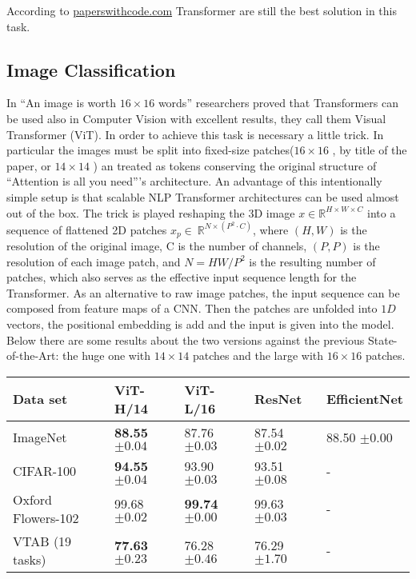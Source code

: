 \documentclass[11pt]{article}
\newcommand\R{\ensuremath{\mathbb{R}}}
\begin{document}
\noindent According to \href{https://paperswithcode.com/sota/machine-translation-on-wmt2014-english-german}{paperswithcode.com} Transformer are still the best solution in this task.

\subsection{Image Classification}
In ``An image is worth $16\times16$ words'' researchers proved that Transformers can be used also in Computer Vision with excellent results, they call them Visual Transformer (ViT). In order to achieve this task is necessary a little trick. In particular the images must be split into fixed-size patches($16\times16$ , by title of the paper, or $14\times14$ ) an treated as tokens conserving the original structure of  ``Attention is all you need'''s architecture. An advantage of this intentionally simple setup is that scalable NLP Transformer architectures can be used almost out of the box. The trick is played reshaping the 3D image $x \in \R^{H \times W \times C}$ into a sequence of flattened 2D patches $x_p \in \ \R^{N \times (P^2 \cdot  C)}$, where $(H,W)$ is the resolution of the original image, C is the number of channels, $(P,P)$ is the resolution of each image patch, and $N =HW/P^2$ is the resulting number of patches, which also serves as the effective input sequence length for the Transformer. As an alternative to raw image patches, the input sequence can be composed from feature maps of a CNN. Then the patches are unfolded into $1D$ vectors, the positional embedding is add and the input is given into the model. Below there are some results about the two versions against the previous State-of-the-Art: the huge one with $14\times14$ patches and the large with $16\times16$ patches.

\begin{longtable}{ p{4cm}  p{2.2cm}   p{2.2cm}  p{2cm}  p{2cm}}
\hline \hline 
Data set 			& ViT-H/14 		& ViT-L/16			 & ResNet 		& EfficientNet \\
\hline \hline 
ImageNet	 		& \textbf{88.55 $\pm 0.04$}	& 87.76 $\pm 0.03$	& 87.54 $\pm 0.02$	& 88.50 $\pm 0.00$	\\
CIFAR-100 		& \textbf{94.55 $\pm 0.04$} 	& 93.90 $\pm 0.03$	& 93.51 $\pm 0.08$	& - 	\\
Oxford Flowers-102 	& 99.68 $\pm 0.02$ 	& \textbf{99.74 $\pm 0.00$}	& 99.63 $\pm 0.03$	& -	\\
VTAB (19 tasks)	& \textbf{77.63 $\pm 0.23$} 	& 76.28 $\pm 0.46$	& 76.29 $\pm 1.70$	& -	\\
\hline
\end{longtable}
\end{document}
